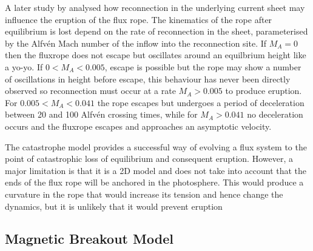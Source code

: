 A later study by \citet{priest2000} analysed how reconnection in the underlying current sheet may influence the eruption of the flux rope. The kinematics of the rope after equilibrium is lost depend on the rate of reconnection in the sheet, parameterised by the Alfv\'{e}n Mach number of the inflow into the reconnection site. If $M_A=0$ then the fluxrope does not escape but oscillates around an equilbrium height like a yo-yo. If $0<M_A<0.005$, escape is possible but the rope may show a number of oscillations in height before escape, this behaviour has never been directly observed so reconnection must occur at a rate $M_A>0.005$ to produce eruption.  For $0.005<M_A<0.041$ the rope escapes but undergoes a period of deceleration between 20 and 100 Alfv\'{e}n crossing times, while for $M_A > 0.041$ no deceleration occurs and the fluxrope escapes and approaches an asymptotic velocity.

The catastrophe model provides a successful way of evolving a flux system to the point of catastrophic loss of equilibrium and consequent eruption. However, a major limitation is that it is a 2D model and does not take into account that the ends of the flux rope will be anchored in the photosphere. This would produce a curvature in the rope that would increase its tension and hence change the dynamics, but it is unlikely that it would prevent eruption \citep{steele1989}




\subsection{Magnetic Breakout Model}\label{sec:21}

